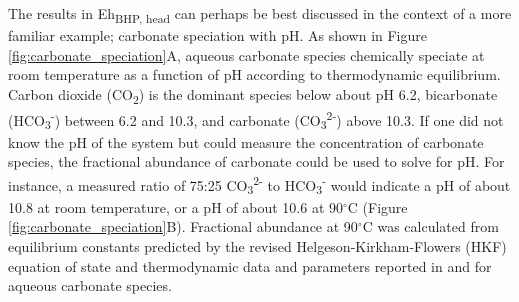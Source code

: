 The results in Eh\textsubscript{BHP, head} can perhaps be best discussed in the context of a more familiar example; carbonate speciation with pH. As shown in Figure \ref{fig:carbonate_speciation}A, aqueous carbonate species chemically speciate at room temperature as a function of pH according to thermodynamic equilibrium. Carbon dioxide (CO\textsubscript{2}) is the dominant species below about pH 6.2, bicarbonate (HCO\textsubscript{3}\textsuperscript{-}) between 6.2 and 10.3, and carbonate (CO\textsubscript{3}\textsuperscript{2-}) above 10.3. If one did not know the pH of the system but could measure the concentration of carbonate species, the fractional abundance of carbonate could be used to solve for pH. For instance, a measured ratio of 75:25 CO\textsubscript{3}\textsuperscript{2-} to HCO\textsubscript{3}\textsuperscript{-} would indicate a pH of about 10.8 at room temperature, or a pH of about 10.6 at 90$^{\circ}$C (Figure \ref{fig:carbonate_speciation}B). Fractional abundance at 90$^{\circ}$C was calculated from equilibrium constants predicted by the revised Helgeson-Kirkham-Flowers (HKF) equation of state \citep{shock1992calculation} and thermodynamic data and parameters reported in \cite{shock1988calculation} and \cite{plyasunov2001correlation} for aqueous carbonate species.

